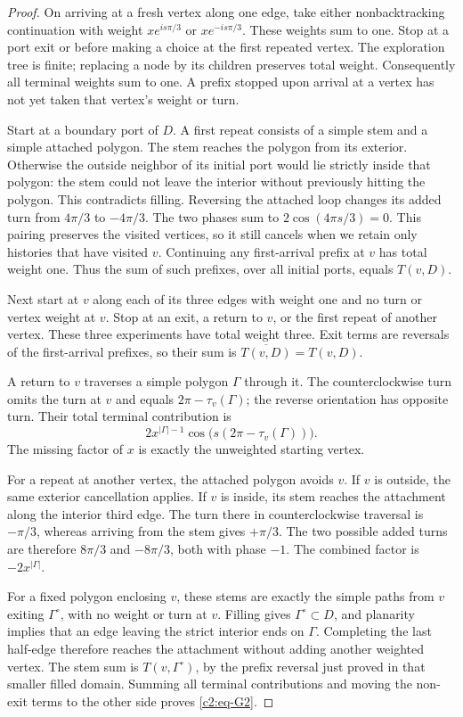 \begin{proof}
On arriving at a fresh vertex along one edge, take either nonbacktracking
continuation with weight $xe^{is\pi/3}$ or $xe^{-is\pi/3}$.  These weights
sum to one.  Stop at a port exit or before making a choice at the first
repeated vertex.  The exploration tree is finite; replacing a node by
its children preserves total weight.  Consequently all terminal weights
sum to one.  A prefix stopped upon arrival at a vertex has not yet taken
that vertex's weight or turn.

Start at a boundary port of $D$.  A first repeat consists of a simple
stem and a simple attached polygon.  The stem reaches the polygon from
its exterior.  Otherwise the outside neighbor of its initial port would
lie strictly inside that polygon: the stem could not leave the interior
without previously hitting the polygon.  This contradicts filling.
Reversing the attached loop changes its added turn from $4\pi/3$ to
$-4\pi/3$.  The two phases sum to
$2\cos(4\pi s/3)=0$.  This pairing preserves the visited vertices,
so it still cancels when we retain only histories that have visited $v$.
Continuing any first-arrival prefix at $v$ has total weight one.
Thus the sum of such prefixes, over all initial ports, equals $T(v,D)$.

Next start at $v$ along each of its three edges with weight one and no
turn or vertex weight at $v$.  Stop at an exit, a return to $v$, or the
first repeat of another vertex.  These three experiments have total
weight three.  Exit terms are reversals of the first-arrival prefixes,
so their sum is $\overline{T(v,D)}=T(v,D)$.

A return to $v$ traverses a simple polygon $\Gamma$ through it.  The
counterclockwise turn omits the turn at $v$ and equals
$2\pi-\tau_v(\Gamma)$; the reverse orientation has opposite turn.
Their total terminal contribution is
\[
 2x^{|\Gamma|-1}\cos\big(s(2\pi-\tau_v(\Gamma))\big).
\]
The missing factor of $x$ is exactly the unweighted starting vertex.

For a repeat at another vertex, the attached polygon avoids $v$.
If $v$ is outside, the same exterior cancellation applies.
If $v$ is inside, its stem reaches the attachment along the interior
third edge.  The turn there in counterclockwise traversal is $-\pi/3$,
whereas arriving from the stem gives $+\pi/3$.  The two possible added
turns are therefore $8\pi/3$ and $-8\pi/3$, both with phase $-1$.
The combined factor is $-2x^{|\Gamma|}$.

For a fixed polygon enclosing $v$, these stems are exactly the simple
paths from $v$ exiting $\Gamma^\circ$, with no weight or turn at $v$.
Filling gives $\Gamma^\circ\subset D$, and planarity implies that an
edge leaving the strict interior ends on $\Gamma$.  Completing the
last half-edge therefore reaches the attachment without adding another
weighted vertex.  The stem sum is $T(v,\Gamma^\circ)$, by the prefix
reversal just proved in that smaller filled domain.  Summing all terminal
contributions and moving the non-exit terms to the other side proves
\eqref{c2:eq-G2}.


\end{proof}
